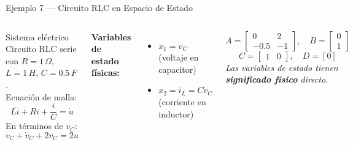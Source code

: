 \documentclass[aspectratio=169,xcolor=dvipsnames]{beamer}
\begin{document}
\begin{frame}{Ejemplo 7 --- Circuito RLC en Espacio de Estado}
    \begin{columns}
        \begin{exampleblock}{Sistema el\'ectrico}
            Circuito RLC serie con $R=1\,\Omega$, $L=1\,H$, $C=0.5\,F$.\\[0.5em]
            Ecuaci\'on de malla:
            \[
                L\ddot{i} + R\dot{i} + \frac{i}{C} = \dot{u}
            \]
            En t\'erminos de $v_C$:
            \[
                \ddot{v}_C + \dot{v}_C + 2v_C = 2u
            \]
        \end{exampleblock}
        \textbf{Variables de estado f\'isicas:}
        \begin{itemize}
            \item $x_1 = v_C$ (voltaje en capacitor)
            \item $x_2 = i_L = C\dot{v}_C$ (corriente en inductor)
        \end{itemize}
        \vspace{0.3em}
        \begin{equation}
            A = \begin{bmatrix} 0 & 2 \\ -0.5 & -1 \end{bmatrix}, \quad
            B = \begin{bmatrix} 0 \\ 1 \end{bmatrix}
        \end{equation}
        \begin{equation}
            C = \begin{bmatrix} 1 & 0 \end{bmatrix}, \quad D = [0]
        \end{equation}
        \vspace{0.2em}
        \textit{Las variables de estado tienen \textbf{significado f\'isico} directo.}
    \end{columns}
\end{frame}
\end{document}
